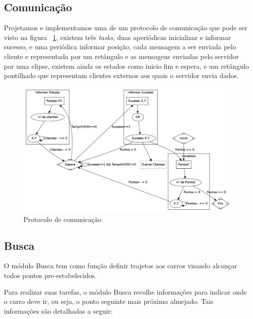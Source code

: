 \documentclass{abnt}
\begin{document}
        \subsection{Comunicação}

        Projetamos e implementamos uma de um protocolo de comunicação que pode
        ser visto na figura ~\ref{protocolo}, existem três \textit{tasks}, duas
        aperiódicas inicializar e informar sucesso, e uma periódica informar
        posição, cada mensagem a ser enviada pelo cliente e representada por
        um retângulo e as mensagens enviadas pelo servidor por uma elipse,
        existem ainda os estados como inicio fim e espera, e um retângulo
        pontilhado que representam clientes externos aos quais o servidor envia
        dados.

         \begin{figure}[ht!]
             \centering
             \includegraphics[scale=0.35]{Protocolo.jpg}
             \caption{Protocolo de comunicação \label{protocolo}}
         \end{figure}
       \newpage 
        \subsection{Busca}

        O módulo Busca tem como função definir trajetos aos carros visando
        alcançar todos pontos pre-estabelecidos.

        Para realizar suas tarefas, o módulo Busca recolhe informações para
        indicar onde o carro deve ir, ou seja, o ponto seguinte mais próximo
        almejado. Tais informações são detalhadas a seguir:
\end{document}

